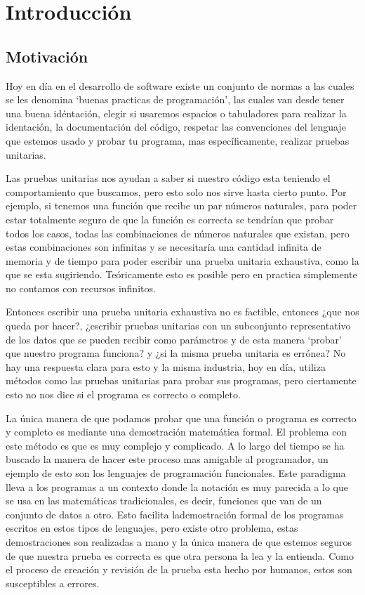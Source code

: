 \chapter{Introducción}

\section{Motivación}
Hoy en día en el desarrollo de software existe un conjunto de normas a las cuales se les denomina
`buenas practicas de programaci\'on', las cuales van desde tener una buena idéntaci\'on, elegir si
usaremos espacios o tabuladores para realizar la identaci\'on, la documentaci\'on del c\'odigo,
respetar las convenciones del lenguaje que estemos usado y probar tu programa, mas específicamente,
realizar pruebas unitarias.

Las pruebas unitarias nos ayudan a saber si nuestro código esta teniendo el comportamiento que
buscamos, pero esto solo nos sirve hasta cierto punto. Por ejemplo, si tenemos una funci\'on que
recibe un par números naturales, para poder estar totalmente seguro de que la funci\'on es correcta
se tendrían que probar todos los casos, todas las combinaciones de números naturales que existan,
pero estas combinaciones son infinitas y se necesitaría una cantidad infinita de memoria y de
tiempo para poder escribir una prueba unitaria exhaustiva, como la que se esta sugiriendo.
Teóricamente esto es posible pero en practica simplemente no contamos con recursos infinitos.

Entonces escribir una prueba unitaria exhaustiva no es factible, entonces ¿que nos queda por
hacer?, ¿escribir pruebas unitarias con un subconjunto representativo de los datos que se pueden
recibir como parámetros y de esta manera `probar' que nuestro programa funciona? y ¿si la misma
prueba unitaria es errónea? No hay una respuesta clara para esto y la misma industria, hoy en día,
utiliza métodos como las pruebas unitarias para probar sus programas, pero ciertamente esto no nos
dice si el programa es correcto o completo.

La única manera de que podamos probar que una función o programa es correcto y completo es mediante
una demostraci\'on matemática formal. El problema con este método es que es muy complejo y
complicado. A lo largo del tiempo se ha buscado la manera de hacer este proceso mas amigable al
programador, un ejemplo de esto son los lenguajes de programación funcionales. Este paradigma lleva
a los programas a un contexto donde la notaci\'on es muy parecida a lo que se usa en las
matemáticas tradicionales, es decir, funciones que van de un conjunto de datos a otro. Esto
facilita lademostraci\'on formal de los programas escritos en estos tipos de lenguajes, pero existe
otro problema, estas demostraciones son realizadas a mano y la \'unica manera de que estemos
seguros de que nuestra prueba es correcta es que otra persona la lea y la entienda. Como el proceso
de creaci\'on y revisi\'on de la prueba esta hecho por humanos, estos son susceptibles a errores.

